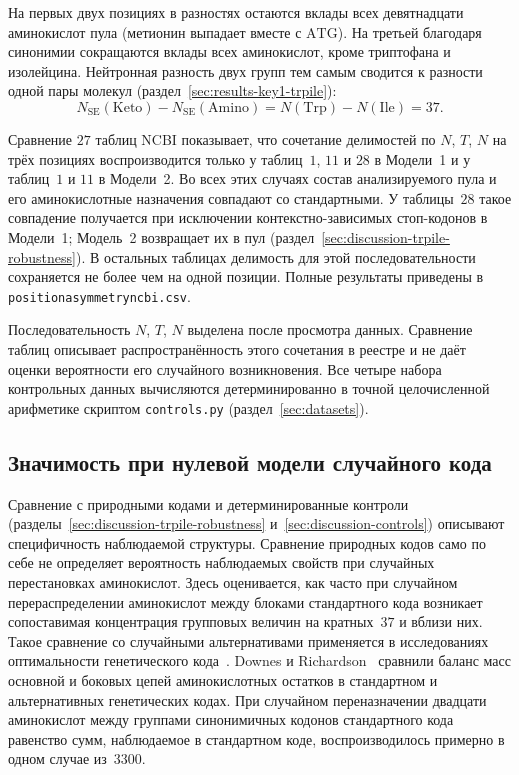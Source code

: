 \documentclass[11pt,a4paper]{article}
\renewcommand{\_}{\origunderscore\allowbreak}
\begin{document}
На первых двух позициях в разностях остаются вклады
всех девятнадцати аминокислот пула (метионин выпадает вместе с $\mathrm{ATG}$). На третьей благодаря
синонимии сокращаются вклады всех аминокислот, кроме
триптофана и изолейцина. Нейтронная разность двух групп
тем самым сводится к разности одной пары молекул
(раздел~\ref{sec:results-key1-trpile}):
\[
N_{\mathrm{SE}}(\mathrm{Keto})
-N_{\mathrm{SE}}(\mathrm{Amino})
=N(\mathrm{Trp})-N(\mathrm{Ile})=37.
\]

Сравнение $27$ таблиц NCBI показывает, что сочетание
делимостей по $N$, $T$, $N$ на трёх позициях
воспроизводится только у таблиц~$1$, $11$ и $28$
в Модели~1 и у таблиц~$1$ и $11$ в Модели~2.
Во всех этих случаях состав анализируемого пула
и его аминокислотные назначения совпадают со стандартными.
У таблицы~$28$ такое совпадение получается при исключении
контекстно-зависимых стоп-кодонов в Модели~1;
Модель~2 возвращает их в пул
(раздел~\ref{sec:discussion-trpile-robustness}).
В остальных таблицах делимость для этой последовательности
сохраняется не более чем на одной позиции.
Полные результаты приведены в
\texttt{position\_asymmetry\_ncbi.csv}.

Последовательность $N$, $T$, $N$ выделена после просмотра данных.
Сравнение таблиц описывает распространённость этого сочетания
в реестре и не даёт оценки вероятности его случайного возникновения.
Все четыре набора контрольных данных вычисляются
детерминированно в точной целочисленной арифметике
скриптом \texttt{controls.py}
(раздел~\ref{sec:datasets}).

\subsection{Значимость при нулевой модели случайного кода}
\label{sec:discussion-montecarlo}

Сравнение с природными кодами и детерминированные контроли
(разделы~\ref{sec:discussion-trpile-robustness}
и~\ref{sec:discussion-controls}) описывают специфичность
наблюдаемой структуры. Сравнение природных кодов само по себе
не определяет вероятность наблюдаемых свойств при случайных
перестановках аминокислот. Здесь оценивается, как часто при случайном
перераспределении аминокислот между блоками стандартного кода
возникает сопоставимая концентрация групповых величин на
кратных~$37$ и вблизи них. Такое сравнение со случайными альтернативами применяется
в исследованиях оптимальности генетического кода~\citep{haig1991,freeland1998}. Downes и Richardson~\cite{downes2002} сравнили баланс масс основной и боковых цепей аминокислотных остатков в стандартном и альтернативных генетических кодах. При случайном переназначении двадцати аминокислот между группами синонимичных кодонов стандартного кода равенство сумм, наблюдаемое в стандартном коде, воспроизводилось примерно в одном случае из~$3300$.
\end{document}
